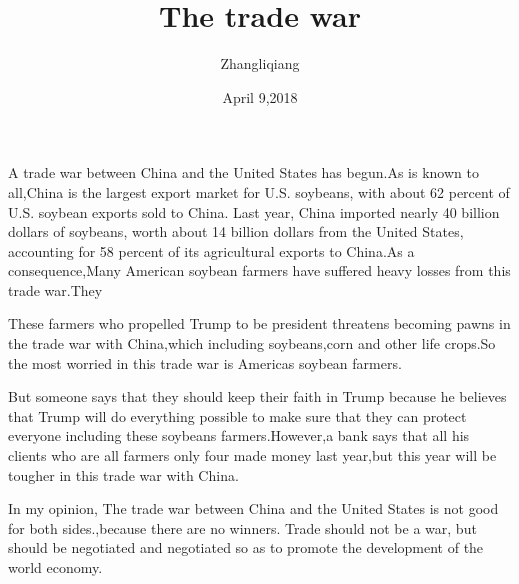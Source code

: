 \documentclass{article}
\author{Zhangliqiang}
\date{April 9,2018}
\title{The trade war}
\begin{document}
\maketitle

A trade war between China and the United States has begun.As is known to all,China is the largest export market for U.S. soybeans, with about 62 percent of U.S. soybean exports sold to China. Last year, China imported nearly 40 billion dollars of soybeans, worth about 14 billion dollars from the United States, accounting for 58 percent of its agricultural exports to China.As a consequence,Many American soybean farmers have suffered heavy losses from this trade war.They

These farmers who propelled Trump to be president threatens becoming pawns in the trade war with China,which including soybeans,corn and other life crops.So the most worried in this trade war is Americas soybean farmers.

But someone says that they should keep their faith in Trump because he believes that Trump will do everything possible to make sure that they can protect everyone including these soybeans farmers.However,a bank says that all his clients who are all farmers only four made money last year,but this year will be tougher in this trade war with China.

In my opinion, The trade war between China and the United States is not good for both sides.,because there are no winners. Trade should not be a war, but should be negotiated and negotiated so as to promote the development of the world economy.
\end{document}
